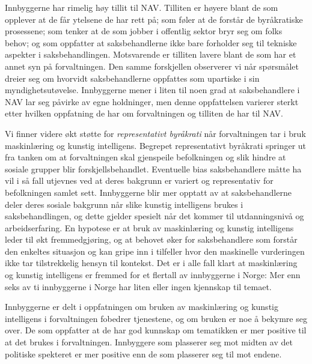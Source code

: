 \documentclass[
]{book}
\begin{document}
Innbyggerne har rimelig høy tillit til NAV.
Tilliten er høyere blant de som opplever at de får ytelsene de har rett på; som føler at de forstår de byråkratiske prosessene; som tenker at de som jobber i offentlig sektor bryr seg om folks behov; og som oppfatter at saksbehandlerne ikke bare forholder seg til tekniske aspekter i saksbehandlingen.
Motsvarende er tilliten lavere blant de som har et annet syn på forvaltningen.
Den samme forskjellen observerer vi når spørsmålet dreier seg om hvorvidt saksbehandlerne oppfattes som upartiske i sin myndighetsutøvelse.
Innbyggerne mener i liten til noen grad at saksbehandlere i NAV lar seg påvirke av egne holdninger, men denne oppfattelsen varierer sterkt etter hvilken oppfatning de har om forvaltningen og tilliten de har til NAV.

Vi finner videre økt støtte for \emph{representativt byråkrati} når forvaltningen tar i bruk maskinlæring og kunstig intelligens.
Begrepet representativt byråkrati springer ut fra tanken om at forvaltningen skal gjenspeile befolkningen og slik hindre at sosiale grupper blir forskjellsbehandlet.
Eventuelle bias saksbehandlere måtte ha vil i så fall utjevnes ved at deres bakgrunn er variert og representativ for befolkningen samlet sett.
Innbyggerne blir mer opptatt av at saksbehandlerne deler deres sosiale bakgrunn når slike kunstig intelligens brukes i saksbehandlingen, og dette gjelder spesielt når det kommer til utdanningsnivå og arbeidserfaring.
En hypotese er at bruk av maskinlæring og kunstig intelligens leder til økt fremmedgjøring, og at behovet øker for saksbehandlere som forstår den enkeltes situasjon og kan gripe inn i tilfeller hvor den maskinelle vurderingen ikke tar tilstrekkelig hensyn til kontekst.
Det er i alle fall klart at maskinlæring og kunstig intelligens er fremmed for et flertall av innbyggerne i Norge:
Mer enn seks av ti innbyggerne i Norge har liten eller ingen kjennskap til temaet.

Innbyggerne er delt i oppfatningen om bruken av maskinlæring og kunstig intelligens i forvaltningen fobedrer tjenestene, og om bruken er noe å bekymre seg over.
De som oppfatter at de har god kunnskap om tematikken er mer positive til at det brukes i forvaltningen.
Innbyggere som plasserer seg mot midten av det politiske spekteret er mer positive enn de som plasserer seg til mot endene.
\end{document}
